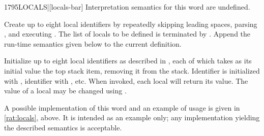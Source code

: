 \begin{worddef}[LOCALS]{1795}{LOCALS|}[locals-bar]
\interpret
	Interpretation semantics for this word are undefined.

\compile

	Create up to eight local identifiers by repeatedly skipping
	leading spaces, parsing , and executing
	. The list of locals to be defined
	is terminated by \param{|}. Append the run-time semantics given
	below to the current definition.

\runtime

	Initialize up to eight local identifiers as described in
	, each of which takes as its
	initial value the top stack item, removing it from the stack.
	Identifier  is initialized with ,
	identifier  with , etc. When invoked,
	each local will return its value. The value of a local may be
	changed using .

	\begin{defer}
	\rationale %
		A possible implementation of this word and an example of usage
		is given in \ref{rat:locals}, above. It is intended as an
		example only; any implementation yielding the described
		semantics is acceptable.
	\end{defer}
\end{worddef}
